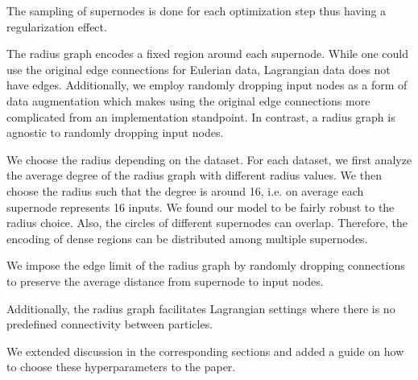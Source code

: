 The sampling of supernodes is done for each optimization step thus having a regularization effect.

The radius graph encodes a fixed region around each supernode. While one could use the original edge connections for Eulerian data, Lagrangian data does not have edges. Additionally, we employ randomly dropping input nodes as a form of data augmentation which makes using the original edge connections more complicated from an implementation standpoint. In contrast, a radius graph is agnostic to randomly dropping input nodes.

We choose the radius depending on the dataset. For each dataset, we first analyze the average degree of the radius graph with different radius values. We then choose the radius such that the degree is around 16, i.e. on average each supernode represents 16 inputs. We found our model to be fairly robust to the radius choice. Also, the circles of different supernodes can overlap. Therefore, the encoding of dense regions can be distributed among multiple supernodes.

We impose the edge limit of the radius graph by randomly dropping connections to preserve the average distance from supernode to input nodes.





Additionally, the radius graph facilitates Lagrangian settings where there is no predefined connectivity between particles.


We extended discussion in the corresponding sections and added a guide on how to choose these hyperparameters to the paper.
